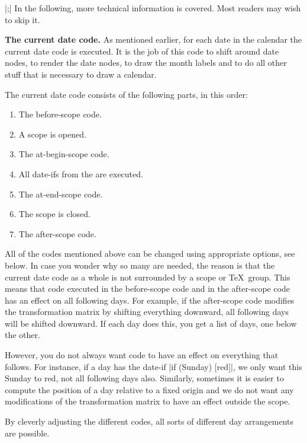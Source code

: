 \begin{command}{\calendar {}|;|}
    In the following, more technical information is covered. Most readers may
    wish to skip it.

    \medskip
    \textbf{The current date code.}
    As mentioned earlier, for each date in the calendar the current date code
    is executed. It is the job of this code to shift around date nodes, to
    render the date nodes, to draw the month labels and to do all other stuff
    that is necessary to draw a calendar.

    The current date code consists of the following parts, in this order:
    \begin{enumerate}
        \item The before-scope code.
        \item A scope is opened.
        \item The at-begin-scope code.
        \item All date-ifs from the  are executed.
        \item The at-end-scope code.
        \item The scope is closed.
        \item The after-scope code.
    \end{enumerate}
    All of the codes mentioned above can be changed using appropriate options,
    see below. In case you wonder why so many are needed, the reason is that
    the current date code as a whole is not surrounded by a scope or \TeX\
    group. This means that code executed in the before-scope code and in the
    after-scope code has an effect on all following days. For example, if the
    after-scope code modifies the transformation matrix by shifting everything
    downward, all following days will be shifted downward. If each day does
    this, you get a list of days, one below the other.

    However, you do not always want code to have an effect on everything that
    follows. For instance, if a day has the date-if |if (Sunday) [red]|, we
    only want this Sunday to red, not all following days also. Similarly,
    sometimes it is easier to compute the position of a day relative to a fixed
    origin and we do not want any modifications of the transformation matrix to
    have an effect outside the scope.

    By cleverly adjusting the different codes, all sorts of different day
    arrangements are possible.


\end{command}
